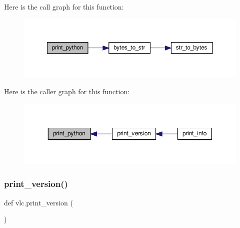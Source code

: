 Here is the call graph for this function\+:
\nopagebreak
\begin{figure}[H]
\begin{center}
\leavevmode
\includegraphics[width=350pt]{namespacevlc_ae0936d317dae71f70be626cab39c5358_cgraph}
\end{center}
\end{figure}
Here is the caller graph for this function\+:
\nopagebreak
\begin{figure}[H]
\begin{center}
\leavevmode
\includegraphics[width=350pt]{namespacevlc_ae0936d317dae71f70be626cab39c5358_icgraph}
\end{center}
\end{figure}
\mbox{\label{namespacevlc_afaf7aed42d25971d0efaf408a51c8f2d}} 
\subsubsection{\texorpdfstring{print\+\_\+version()}{print\_version()}}
{\footnotesize\ttfamily def vlc.\+print\+\_\+version (\begin{DoxyParamCaption}{ }\end{DoxyParamCaption})}

